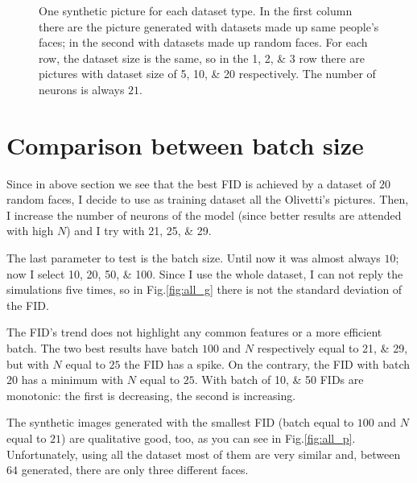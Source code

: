 \documentclass[a4paper,12pt]{article}
\begin{document}
\begin{figure}[p]
  \caption[Picture with different dataset's size]{One synthetic picture for each dataset type.
  In the first column there are the picture generated with datasets made up same people's faces; in the second with datasets made up random faces.
  For each row, the dataset size is the same, so in the \numlist{1;2;3} row there are pictures with dataset size of \numlist{5;10;20} respectively.
  The number of neurons is always $21$.
  }
  \label{fig:greg_p}
\end{figure}

\section{Comparison between batch size}
Since in above section we see that the best FID is achieved by a dataset of $20$ random faces, I decide to use as training dataset all the Olivetti's pictures.
Then, I increase the number of neurons of the model (since better results are attended with high $N$) and I try with \numlist{21;25;29}.

The last parameter to test is the batch size.
Until now it was almost always $10$; now I select \numlist{10;20;50;100}.
Since I use the whole dataset, I can not reply the simulations five times, so in Fig.\ref{fig:all_g} there is not the standard deviation of the FID.

The FID's trend does not highlight any common features or a more efficient batch.
The two best results have batch $100$ and $N$ respectively equal to \numlist{21;29}, but with $N$ equal to $25$ the FID has a spike.
On the contrary, the FID with batch $20$ has a minimum with $N$ equal to $25$.
With batch of  \numlist{10;50} FIDs are monotonic: the first is decreasing, the second is increasing.

The synthetic images generated with the smallest FID (batch equal to $100$ and $N$ equal to $21$) are qualitative good, too, as you can see in Fig.\ref{fig:all_p}.
Unfortunately, using all the dataset most of them are very similar and, between $64$ generated, there are only three different faces.
\end{document}
